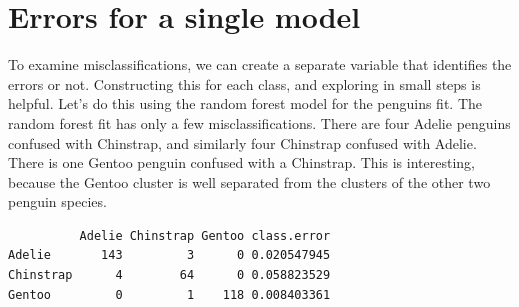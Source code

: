\documentclass[
  letterpaper,
]{krantz}
\newenvironment{Shaded}{\begin{snugshade}}{\end{snugshade}}
\newcommand{\AttributeTok}[1]{\textcolor[rgb]{0.40,0.45,0.13}{#1}}
\newcommand{\DecValTok}[1]{\textcolor[rgb]{0.68,0.00,0.00}{#1}}
\newcommand{\FunctionTok}[1]{\textcolor[rgb]{0.28,0.35,0.67}{#1}}
\newcommand{\NormalTok}[1]{\textcolor[rgb]{0.00,0.23,0.31}{#1}}
\newcommand{\OtherTok}[1]{\textcolor[rgb]{0.00,0.23,0.31}{#1}}
\newcommand{\SpecialCharTok}[1]{\textcolor[rgb]{0.37,0.37,0.37}{#1}}
\begin{document}

\section{Errors for a single model}\label{errors-for-a-single-model}

To examine misclassifications, we can create a separate variable that
identifies the errors or not. Constructing this for each class, and
exploring in small steps is helpful. Let's do this using the random
forest model for the penguins fit. The random forest fit has only a few
misclassifications. There are four Adelie penguins confused with
Chinstrap, and similarly four Chinstrap confused with Adelie. There is
one Gentoo penguin confused with a Chinstrap. This is interesting,
because the Gentoo cluster is well separated from the clusters of the
other two penguin species.


\begin{Shaded}
\end{Shaded}

\begin{verbatim}
          Adelie Chinstrap Gentoo class.error
Adelie       143         3      0 0.020547945
Chinstrap      4        64      0 0.058823529
Gentoo         0         1    118 0.008403361
\end{verbatim}

\begin{Shaded}
\end{Shaded}
\end{document}
